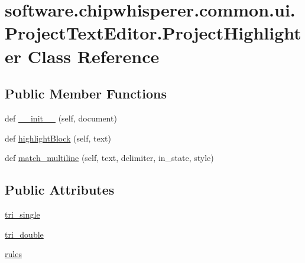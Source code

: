 \hypertarget{classsoftware_1_1chipwhisperer_1_1common_1_1ui_1_1ProjectTextEditor_1_1ProjectHighlighter}{}\section{software.\+chipwhisperer.\+common.\+ui.\+Project\+Text\+Editor.\+Project\+Highlighter Class Reference}
\label{classsoftware_1_1chipwhisperer_1_1common_1_1ui_1_1ProjectTextEditor_1_1ProjectHighlighter}
\subsection*{Public Member Functions}
\begin{DoxyCompactItemize}
\item 
def \hyperlink{classsoftware_1_1chipwhisperer_1_1common_1_1ui_1_1ProjectTextEditor_1_1ProjectHighlighter_a0be841ea2ac7e1b7e785a2bb5a816b88}{\+\_\+\+\_\+init\+\_\+\+\_\+} (self, document)
\item 
def \hyperlink{classsoftware_1_1chipwhisperer_1_1common_1_1ui_1_1ProjectTextEditor_1_1ProjectHighlighter_a0a7f2a6173c666ad5759a040065d12ea}{highlight\+Block} (self, text)
\item 
def \hyperlink{classsoftware_1_1chipwhisperer_1_1common_1_1ui_1_1ProjectTextEditor_1_1ProjectHighlighter_a993aa7678b330cf6bc69f3f273ef591c}{match\+\_\+multiline} (self, text, delimiter, in\+\_\+state, style)
\end{DoxyCompactItemize}
\subsection*{Public Attributes}
\begin{DoxyCompactItemize}
\item 
\hyperlink{classsoftware_1_1chipwhisperer_1_1common_1_1ui_1_1ProjectTextEditor_1_1ProjectHighlighter_a7f3079f9c00c29c35f090685a2ed7cf4}{tri\+\_\+single}
\item 
\hyperlink{classsoftware_1_1chipwhisperer_1_1common_1_1ui_1_1ProjectTextEditor_1_1ProjectHighlighter_a58d6253ebc44e23d7daa65b28e35ca69}{tri\+\_\+double}
\item 
\hyperlink{classsoftware_1_1chipwhisperer_1_1common_1_1ui_1_1ProjectTextEditor_1_1ProjectHighlighter_a0b979a5eeb15d0d1460c1b673cc7f4f2}{rules}
\end{DoxyCompactItemize}
